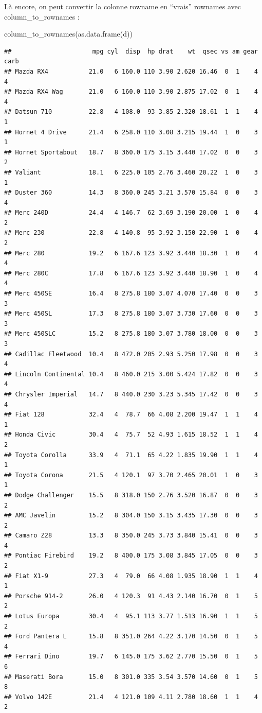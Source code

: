 \documentclass[
]{book}
\newenvironment{Shaded}{\begin{snugshade}}{\end{snugshade}}
\newcommand{\FunctionTok}[1]{\textcolor[rgb]{0.00,0.00,0.00}{#1}}
\newcommand{\NormalTok}[1]{#1}
\begin{document}
Là encore, on peut convertir la colonne rowname en ``vrais'' rownames avec column\_to\_rownames :

\begin{Shaded}
\begin{Highlighting}[]
\FunctionTok{column\_to\_rownames}\NormalTok{(}\FunctionTok{as.data.frame}\NormalTok{(d))}
\end{Highlighting}
\end{Shaded}

\begin{verbatim}
##                      mpg cyl  disp  hp drat    wt  qsec vs am gear carb
## Mazda RX4           21.0   6 160.0 110 3.90 2.620 16.46  0  1    4    4
## Mazda RX4 Wag       21.0   6 160.0 110 3.90 2.875 17.02  0  1    4    4
## Datsun 710          22.8   4 108.0  93 3.85 2.320 18.61  1  1    4    1
## Hornet 4 Drive      21.4   6 258.0 110 3.08 3.215 19.44  1  0    3    1
## Hornet Sportabout   18.7   8 360.0 175 3.15 3.440 17.02  0  0    3    2
## Valiant             18.1   6 225.0 105 2.76 3.460 20.22  1  0    3    1
## Duster 360          14.3   8 360.0 245 3.21 3.570 15.84  0  0    3    4
## Merc 240D           24.4   4 146.7  62 3.69 3.190 20.00  1  0    4    2
## Merc 230            22.8   4 140.8  95 3.92 3.150 22.90  1  0    4    2
## Merc 280            19.2   6 167.6 123 3.92 3.440 18.30  1  0    4    4
## Merc 280C           17.8   6 167.6 123 3.92 3.440 18.90  1  0    4    4
## Merc 450SE          16.4   8 275.8 180 3.07 4.070 17.40  0  0    3    3
## Merc 450SL          17.3   8 275.8 180 3.07 3.730 17.60  0  0    3    3
## Merc 450SLC         15.2   8 275.8 180 3.07 3.780 18.00  0  0    3    3
## Cadillac Fleetwood  10.4   8 472.0 205 2.93 5.250 17.98  0  0    3    4
## Lincoln Continental 10.4   8 460.0 215 3.00 5.424 17.82  0  0    3    4
## Chrysler Imperial   14.7   8 440.0 230 3.23 5.345 17.42  0  0    3    4
## Fiat 128            32.4   4  78.7  66 4.08 2.200 19.47  1  1    4    1
## Honda Civic         30.4   4  75.7  52 4.93 1.615 18.52  1  1    4    2
## Toyota Corolla      33.9   4  71.1  65 4.22 1.835 19.90  1  1    4    1
## Toyota Corona       21.5   4 120.1  97 3.70 2.465 20.01  1  0    3    1
## Dodge Challenger    15.5   8 318.0 150 2.76 3.520 16.87  0  0    3    2
## AMC Javelin         15.2   8 304.0 150 3.15 3.435 17.30  0  0    3    2
## Camaro Z28          13.3   8 350.0 245 3.73 3.840 15.41  0  0    3    4
## Pontiac Firebird    19.2   8 400.0 175 3.08 3.845 17.05  0  0    3    2
## Fiat X1-9           27.3   4  79.0  66 4.08 1.935 18.90  1  1    4    1
## Porsche 914-2       26.0   4 120.3  91 4.43 2.140 16.70  0  1    5    2
## Lotus Europa        30.4   4  95.1 113 3.77 1.513 16.90  1  1    5    2
## Ford Pantera L      15.8   8 351.0 264 4.22 3.170 14.50  0  1    5    4
## Ferrari Dino        19.7   6 145.0 175 3.62 2.770 15.50  0  1    5    6
## Maserati Bora       15.0   8 301.0 335 3.54 3.570 14.60  0  1    5    8
## Volvo 142E          21.4   4 121.0 109 4.11 2.780 18.60  1  1    4    2
\end{verbatim}
\end{document}
